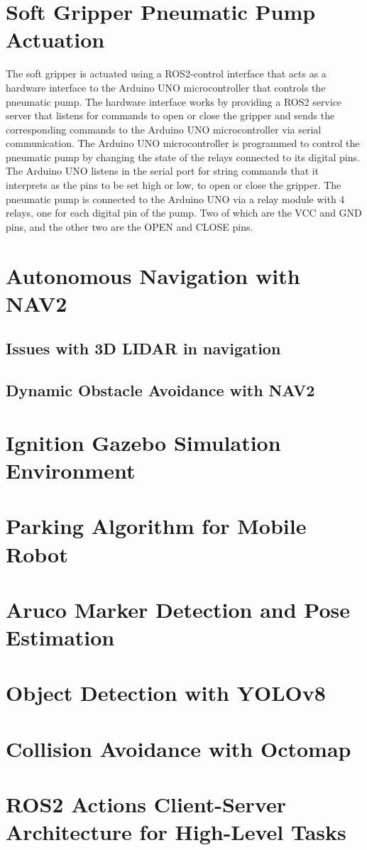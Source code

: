 \section{Soft Gripper Pneumatic Pump Actuation}

The soft gripper is actuated using a ROS2-control interface that acts as a hardware interface to the Arduino UNO
microcontroller that controls the pneumatic pump. The hardware interface works by providing a ROS2 service server that 
listens for commands to open or close the gripper and sends the corresponding commands to the Arduino UNO microcontroller
via serial communication. The Arduino UNO microcontroller is programmed to control the pneumatic pump by changing
the state of the relays connected to its digital pins. The Arduino UNO listens in the serial port for string commands
that it interprets as the pins to be set high or low, to open or close the gripper. The pneumatic pump is connected
to the Arduino UNO via a relay module with 4 relays, one for each digital pin of the pump. Two of which
are the VCC and GND pins, and the other two are the OPEN and CLOSE pins.


\section{Autonomous Navigation with NAV2}

\subsection{Issues with 3D LIDAR in navigation}

\subsection{Dynamic Obstacle Avoidance with NAV2}

\section{Ignition Gazebo Simulation Environment}

\section{Parking Algorithm for Mobile Robot}

\section{Aruco Marker Detection and Pose Estimation}

\section{Object Detection with YOLOv8}

\section{Collision Avoidance with Octomap}

\section{ROS2 Actions Client-Server Architecture for High-Level Tasks}

